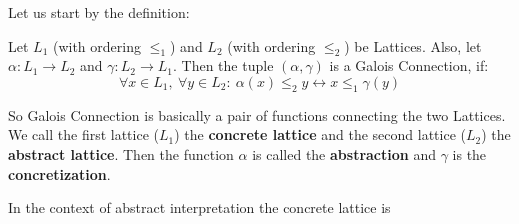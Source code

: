 Let us start by the definition:

\begin{defn}
    Let $L_1$ (with ordering $\leq _1$) and $L_2$ (with ordering $\leq _2$) be Lattices. %
    Also, let $\alpha: L_1 \rightarrow L_2$ and $\gamma: L_2 \rightarrow L_1$.
    Then the tuple $(\alpha, \gamma)$ is a Galois Connection, if:
    \[ \forall x \in L_1, \: \forall y \in L_2: \: \alpha(x) \leq_2 y \leftrightarrow x \leq_1 \gamma(y)\]
\end{defn}

So Galois Connection is basically a pair of functions connecting the two Lattices.
We call the first lattice ($L_1$) the \textbf{concrete lattice} and the second lattice ($L_2$) the \textbf{abstract lattice}.
Then the function $\alpha$ is called the \textbf{abstraction} and $\gamma$ is the \textbf{concretization}.

In the context of abstract interpretation the concrete lattice is 

